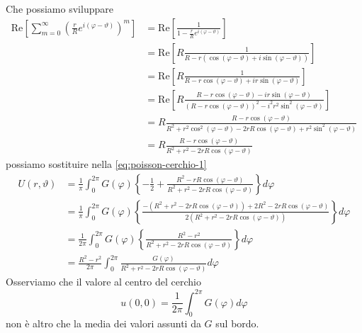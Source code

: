 \documentclass[10pt,a4paper,twoside,openright]{book}
\begin{document}
\begin{dimostrazione}
\begin{equation*}
\end{equation*}
Che possiamo sviluppare
\begin{align*}
\mathrm{Re}\left[\sum\limits ^{\infty }_{m=0}\left(\frac{r}{R} e^{i( \varphi -\vartheta)}\right)^{m}\right] & =\mathrm{Re}\left[\frac{1}{1-\frac{r}{R} e^{i( \varphi -\vartheta)}}\right]\\
 & =\mathrm{Re}\left[ R\frac{1}{R-r(\cos( \varphi -\vartheta) +i\sin( \varphi -\vartheta))}\right]\\
 & =\mathrm{Re}\left[ R\frac{1}{R-r\cos( \varphi -\vartheta) +ir\sin( \varphi -\vartheta)}\right]\\
 & =\mathrm{Re}\left[ R\frac{R-r\cos( \varphi -\vartheta) -ir\sin( \varphi -\vartheta)}{( R-r\cos( \varphi -\vartheta))^{2} -i^{2} r^{2}\sin^{2}( \varphi -\vartheta)}\right]\\
 & =R\frac{R-r\cos( \varphi -\vartheta)}{R^{2} +r^{2}\cos^{2}( \varphi -\vartheta) -2rR\cos( \varphi -\vartheta) +r^{2}\sin^{2}( \varphi -\vartheta)}\\
 & =R\frac{R-r\cos( \varphi -\vartheta)}{R^{2} +r^{2} -2rR\cos( \varphi -\vartheta)}
\end{align*}
possiamo sostituire nella \eqref{eq:poisson-cerchio-1}
\begin{align*}
U(r,\vartheta) & =\frac{1}{\pi }\int ^{2\pi }_{0} G(\varphi)\left\{-\frac{1}{2} +\frac{R^{2} -rR\cos( \varphi -\vartheta)}{R^{2} +r^{2} -2rR\cos( \varphi -\vartheta)}\right\} d\varphi \\
 & =\frac{1}{\pi }\int ^{2\pi }_{0} G(\varphi)\left\{\frac{-\left( R^{2} +r^{2} -2rR\cos( \varphi -\vartheta)\right) +2R^{2} -2rR\cos( \varphi -\vartheta)}{2\left( R^{2} +r^{2} -2rR\cos( \varphi -\vartheta)\right)}\right\} d\varphi \\
 & =\frac{1}{2\pi }\int ^{2\pi }_{0} G(\varphi)\left\{\frac{R^{2} -r^{2}}{R^{2} +r^{2} -2rR\cos( \varphi -\vartheta)}\right\} d\varphi \\
 & =\frac{R^{2} -r^{2}}{2\pi }\int ^{2\pi }_{0}\frac{G(\varphi)}{R^{2} +r^{2} -2rR\cos( \varphi -\vartheta)} d\varphi 
\end{align*}
Osserviamo che il valore al centro del cerchio
\begin{equation*}
u(0,0) =\frac{1}{2\pi }\int ^{2\pi }_{0} G(\varphi) d\varphi 
\end{equation*}
non è altro che la media dei valori assunti da $G$ sul bordo.


\end{dimostrazione}
\end{document}
